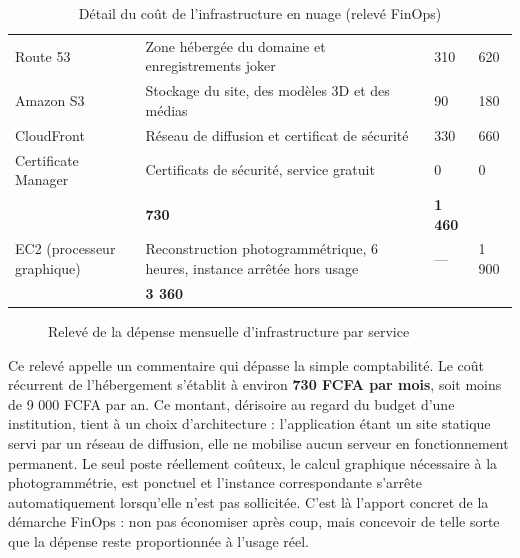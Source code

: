 \begin{table}[htbp]
\centering
\caption{Détail du coût de l'infrastructure en nuage (relevé FinOps)}
\label{tab:finops}
\small
\begin{tabularx}{\textwidth}{|L{3.8cm}|X|R{2.2cm}|R{2.2cm}|}
\hline
{}
 &  &  &  \\ \hline
Route 53 & Zone hébergée du domaine et enregistrements joker & 310 & 620 \\ \hline
Amazon S3 & Stockage du site, des modèles 3D et des médias & 90 & 180 \\ \hline
CloudFront & Réseau de diffusion et certificat de sécurité & 330 & 660 \\ \hline
Certificate Manager & Certificats de sécurité, service gratuit & 0 & 0 \\ \hline
{}
 & \textbf{730} & \textbf{1 460} \\ \hline
EC2 (processeur graphique) & Reconstruction photogrammétrique, 6 heures, instance arrêtée hors usage & — & 1 900 \\ \hline
{}
 & \textbf{3 360} \\ \hline
\end{tabularx}
\end{table}

\begin{figure}[htbp]
\centering
{}
\caption{Relevé de la dépense mensuelle d'infrastructure par service}
\label{fig:finops}
\end{figure}

Ce relevé appelle un commentaire qui dépasse la simple comptabilité. Le coût
récurrent de l'hébergement s'établit à environ \textbf{730 FCFA par mois}, soit
moins de 9 000 FCFA par an. Ce montant, dérisoire au regard du budget d'une
institution, tient à un choix d'architecture : l'application étant un site
statique servi par un réseau de diffusion, elle ne mobilise aucun serveur en
fonctionnement permanent. Le seul poste réellement coûteux, le calcul graphique
nécessaire à la photogrammétrie, est ponctuel et l'instance correspondante
s'arrête automatiquement lorsqu'elle n'est pas sollicitée. C'est là l'apport
concret de la démarche FinOps : non pas économiser après coup, mais concevoir de
telle sorte que la dépense reste proportionnée à l'usage réel.

